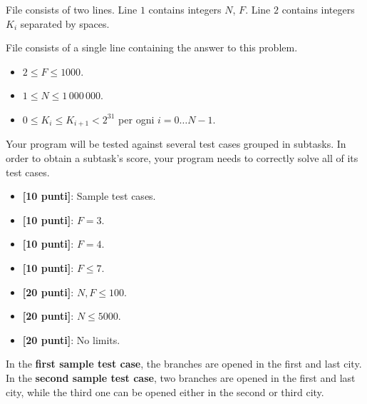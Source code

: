 \InputFile
File  consists of two lines. Line $1$ contains integers $N$, $F$. Line $2$ contains integers $K_i$ separated by spaces.

\OutputFile
File \outputfile{} consists of a single line containing the answer to this problem.

\Constraints
\begin{itemize}[nolistsep, itemsep=2mm]
	\item $2 \le F \le 1000$.
	\item $1 \le N \le 1\,000\,000$.
	\item $0 \le K_i \le K_{i+1} < 2^{31}$ per ogni $i=0\ldots N-1$.
\end{itemize}

\Scoring
Your program will be tested against several test cases grouped in subtasks.
In order to obtain a subtask's score, your program needs to correctly solve all of its test cases.

\begin{itemize}[nolistsep,itemsep=2mm]
  \item \textbf{ [10 punti]}: Sample test cases.
  \item \textbf{ [10 punti]}: $F = 3$.
  \item \textbf{ [10 punti]}: $F = 4$.
  \item \textbf{ [10 punti]}: $F \le 7$.
  \item \textbf{ [20 punti]}: $N, F \leq 100$.
  \item \textbf{ [20 punti]}: $N \leq 5000$.
  \item \textbf{ [20 punti]}: No limits.
\end{itemize}



\Examples
\begin{example}
%
%
\end{example}


\Explanation
In the \textbf{first sample test case}, the branches are opened in the first and last city.\\[2mm]
In the \textbf{second sample test case}, two branches are opened in the first and last city, while the third one can be opened either in the second or third city.
